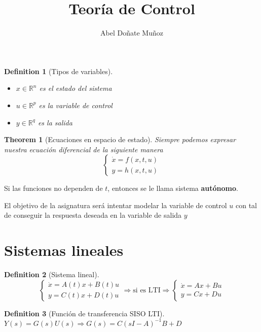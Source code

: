 \documentclass[leqno]{article}
\title{Teoría de Control}
\author{Abel Doñate Muñoz}
\date{}
\newtheorem*{theorem}{Theorem}
\newtheorem*{definition}{Definition}
\begin{document}
\maketitle
\tableofcontents
\newpage

\begin{definition}[Tipos de variables] \
\begin{itemize}[topsep=-6pt, itemsep=0pt]
  \item $x \in \mathbb{R}^n$ es el estado del sistema 
  \item $u \in \mathbb{R}^p$ es la variable de control
  \item $y\in \mathbb{R}^q$ es la salida
\end{itemize}
\end{definition}

\begin{theorem}[Ecuaciones en espacio de estado]
Siempre podemos expresar nuestra ecuación diferencial de la siguiente manera
\[
  \begin{cases}
\dot{x} = f(x, t, u) \\ y = h(x, t, u)
  \end{cases}
\] 
\end{theorem}

Si las funciones no dependen de $t$, entonces se le llama sistema \textbf{autónomo}.


El objetivo de la asignatura será intentar modelar la variable de control $u$ con tal de conseguir la respuesta deseada en la variable de salida $y$


\section{Sistemas lineales}
\begin{definition}[Sistema lineal]
\[
\begin{cases}
  \dot{x}=A(t)x + B(t)u \\ y = C(t)x + D(t)u
\end{cases} \Rightarrow \text{si es LTI} \Rightarrow
\begin{cases}
  \dot{x}=Ax + Bu \\ y = Cx + Du
\end{cases}
\] 
\end{definition}

\begin{definition}[Función de transferencia SISO LTI]  $Y(s)=G(s)U(s) \Rightarrow G(s) = C(sI-A)^{-1}B + D $
\end{definition}
\end{document}
